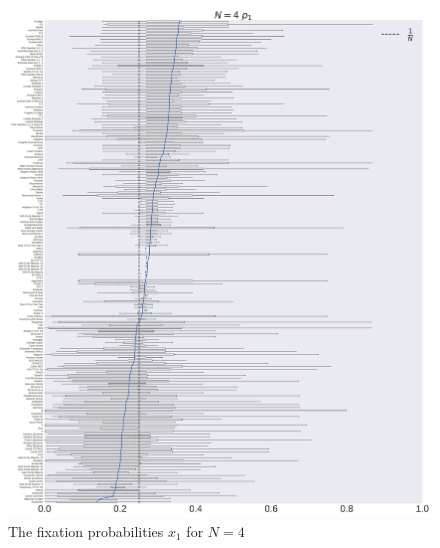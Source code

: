 \documentclass[10pt,letterpaper]{article}
\begin{document}
\begin{figure}[!hbtp]
    \centering
    \includegraphics[width=\textwidth]{./boxplot_4_invade.pdf}
    \caption{The fixation probabilities \(x_1\) for \(N=4\)}
\end{figure}
\end{document}
